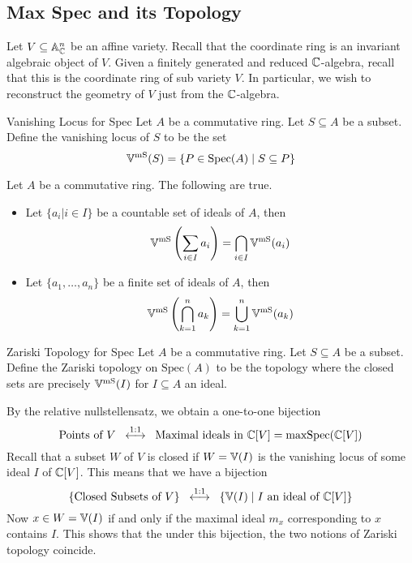 \documentclass[a4paper]{article}
\begin{document}
\subsection{Max Spec and its Topology}
Let $V\subseteq\mathbb{A}_{\mathbb{C}}^n$ be an affine variety. Recall that the coordinate ring is an invariant algebraic object of $V$. Given a finitely generated and reduced $\mathbb{C}$-algebra, recall that this is the coordinate ring of sub variety $V$. In particular, we wish to reconstruct the geometry of $V$ just from the $\mathbb{C}$-algebra. 

\begin{defn}{Vanishing Locus for Spec}{} Let $A$ be a commutative ring. Let $S\subseteq A$ be a subset. Define the vanishing locus of $S$ to be the set $$\mathbb{V}^{\text{mS}}(S)=\{P\in\text{Spec}(A)\;|\;S\subseteq P\}$$
\end{defn}

\begin{lmm}{}{} Let $A$ be a commutative ring. The following are true. 
\begin{itemize}
\item Let $\{a_i|i\in I\}$ be a countable set of ideals of $A$, then $$\mathbb{V}^\text{mS}\left(\sum_{i\in I}a_i\right)=\bigcap_{i\in I}\mathbb{V}^\text{mS}(a_i)$$
\item Let $\{a_1,\dots,a_n\}$ be a finite set of ideals of $A$, then $$\mathbb{V}^\text{mS}\left(\bigcap_{k=1}^na_k\right)=\bigcup_{k=1}^n\mathbb{V}^\text{mS}(a_k)$$
\end{itemize}
\end{lmm}

\begin{defn}{Zariski Topology for Spec}{} Let $A$ be a commutative ring. Let $S\subseteq A$ be a subset. Define the Zariski topology on $\text{Spec}(A)$ to be the topology where the closed sets are precisely $\mathbb{V}^\text{mS}(I)$ for $I\subseteq A$ an ideal. 
\end{defn}

By the relative nullstellensatz, we obtain a one-to-one bijection $$\text{Points of }V\;\;\overset{1:1}{\longleftrightarrow}\;\;\text{Maximal ideals in }\mathbb{C}[V]=\text{maxSpec}(\mathbb{C}[V])$$ Recall that a subset $W$ of $V$ is closed if $W=\mathbb{V}(I)$ is the vanishing locus of some ideal $I$ of $\mathbb{C}[V]$. This means that we have a bijection $$\{\text{Closed Subsets of }V\}\;\;\overset{1:1}{\longleftrightarrow}\;\;\{\mathbb{V}(I)\;|\;I\text{ an ideal of }\mathbb{C}[V]\}$$ Now $x\in W=\mathbb{V}(I)$ if and only if the maximal ideal $m_x$ corresponding to $x$ contains $I$. This shows that the under this bijection, the two notions of Zariski topology coincide. 
\end{document}
